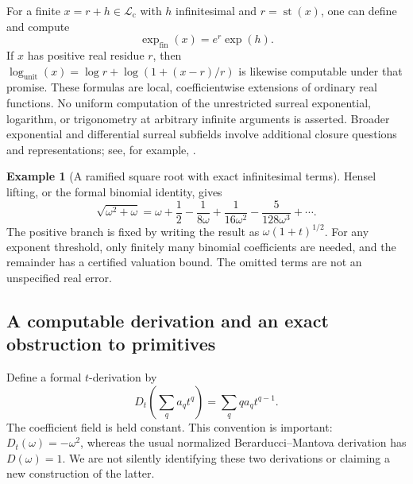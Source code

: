 \documentclass[11pt,letterpaper]{article}
\numberwithin{equation}{section}
\theoremstyle{definition}
\newtheorem{example}[theorem]{Example}
\theoremstyle{remark}
\newcommand{\Lc}{\mathcal L_{\mathrm c}}
\newcommand{\st}{\operatorname{st}}
\begin{document}
For a finite $x=r+h\in\Lc$ with $h$ infinitesimal and $r=\st(x)$,
one can define and compute
\[
 \exp_{\mathrm{fin}}(x)=e^r\exp(h).
\]
If $x$ has positive real residue $r$, then
$\log_{\mathrm{unit}}(x)=\log r+\log(1+(x-r)/r)$ is likewise computable
under that promise. These formulas are local, coefficientwise extensions
of ordinary real functions. No uniform computation of the unrestricted
surreal exponential, logarithm, or trigonometry at arbitrary infinite
arguments is asserted. Broader exponential and differential surreal
subfields involve additional closure questions and representations;
see, for example, \cite{bournez}.

\begin{example}[A ramified square root with exact infinitesimal terms]
Hensel lifting, or the formal binomial identity, gives
\[
 \sqrt{\omega^2+\omega}
 =\omega+\frac12-\frac1{8\omega}
  +\frac1{16\omega^2}-\frac5{128\omega^3}+\cdots.
\]
The positive branch is fixed by writing the result as
$\omega(1+t)^{1/2}$. For any exponent threshold, only finitely many
binomial coefficients are needed, and the remainder has a certified
valuation bound. The omitted terms are not an unspecified real error.
\end{example}

\subsection{A computable derivation and an exact obstruction to primitives}

Define a formal $t$-derivation by
\begin{equation}\label{eq:derivation}
 D_t\!\left(\sum_qa_qt^q\right)=\sum_q q a_qt^{q-1}.
\end{equation}
The coefficient field is held constant. This convention is important:
$D_t(\omega)=-\omega^2$, whereas the usual normalized
Berarducci--Mantova derivation has $D(\omega)=1$. We are not silently
identifying these two derivations or claiming a new construction of the
latter.
\end{document}
